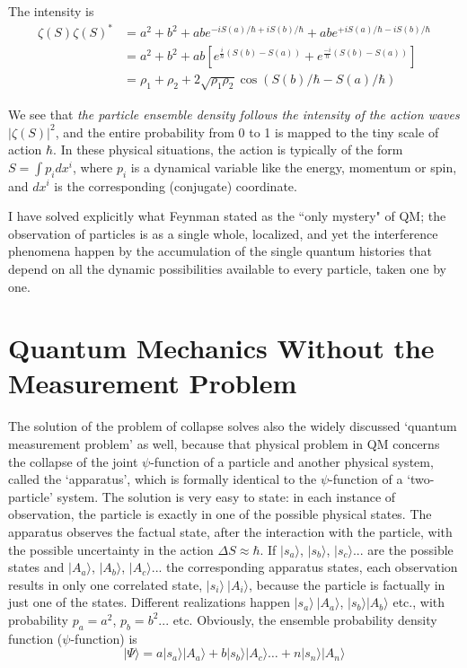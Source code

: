 The intensity is
\begin{align*}
\zeta (S) \zeta (S)^{\ast} & = a^2 + b^2 + abe^{-iS (a) /\hbar + iS (b)/\hbar} + abe^{+ iS (a)/\hbar - iS (b)/\hbar}\tag{29}\label{c14-eq29}  \\
& = a^2 + b^2 + ab \left[e^{\frac{i}{\hbar} (S(b) - S(a))} + e^{\frac{-i}{\hbar}(S(b) - S (a))} \right] \\
& = \rho_1 + \rho_2 + 2 \sqrt{\rho_1 \rho_2} \cos  (S (b) / \hbar - S (a) / \hbar) \tag{30}\label{c14-eq30}
\end{align*}

We see that \textit{the particle ensemble density follows the intensity of the action waves} $|\zeta(S)|^2$,
and the entire probability from 0 to 1 is mapped to the tiny scale of action $\hbar$. In these physical
situations, the action is typically of the form $S = \int p_i dx^i$, where $p_i$ is a dynamical variable
like the energy, momentum or spin, and $dx^i$ is the corresponding (conjugate) coordinate.

I have solved explicitly what Feynman stated as the ``only mystery" of QM; the observation of
 particles is as a single whole, localized, and yet the interference phenomena happen
by the accumulation of the single quantum histories that depend on all the dynamic possibilities available to every particle, taken one by one.

\section{Quantum Mechanics Without the\\ Measurement Problem}\label{c14-sec6}

The solution of the problem of collapse solves also the widely discussed `quantum measurement problem' \cite{chap14-key8} as well, because that physical problem in QM concerns the collapse of the joint $\psi$-function of a particle and another physical system, called the `apparatus', which is
formally identical to the $\psi$-function of a `two-particle' system. The solution is very easy to
state: in each instance of observation, the particle is exactly in one of the possible physical
states. The apparatus observes the factual state, after the interaction with the particle,
with the possible uncertainty in the action $\Delta S \approx \hbar$. If $|s_a  \rangle$, $|s_b\rangle$, $|s_c\rangle...$ are the possible
states and $|A_a \rangle$, $|A_b \rangle$, $|A_c \rangle ...$ the corresponding apparatus states, each observation results in
only one correlated state, $|s_i \rangle ~|A_i \rangle$, because the particle is factually in just one of the states.
Different realizations happen $|s_a \rangle ~ |A_a  \rangle$, $|s_b  \rangle | A_b \rangle$ etc., with probability $p_a = a^2$, $p_b = b^2 ...$ etc.
Obviously, the ensemble probability density function ($\psi$-function) is
\begin{equation*}
|\Psi \rangle = a | s_a \rangle | A_a \rangle + b |s_b \rangle | A_c \rangle \ldots + n | s_n \rangle | A_n \rangle \tag{31}\label{c14-eq31}
\end{equation*}

